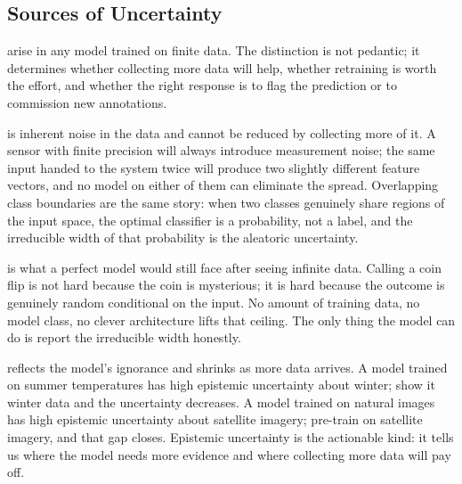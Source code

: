
\newpage

\subsection{Sources of Uncertainty}


 arise in any model trained on finite data.
The distinction is not pedantic; it determines whether collecting more data will help, whether retraining is worth the effort, and whether the right response is to flag the prediction or to commission new annotations.

 is inherent noise in the data and cannot be reduced by collecting more of it.
A sensor with finite precision will always introduce measurement noise; the same input handed to the system twice will produce two slightly different feature vectors, and no model on either of them can eliminate the spread.
Overlapping class boundaries are the same story: when two classes genuinely share regions of the input space, the optimal classifier is a probability, not a label, and the irreducible width of that probability is the aleatoric uncertainty.

 is what a perfect model would still face after seeing infinite data.
Calling a coin flip is not hard because the coin is mysterious; it is hard because the outcome is genuinely random conditional on the input.
No amount of training data, no model class, no clever architecture lifts that ceiling.
The only thing the model can do is report the irreducible width honestly.

 reflects the model's ignorance and shrinks as more data arrives.
A model trained on summer temperatures has high epistemic uncertainty about winter; show it winter data and the uncertainty decreases.
A model trained on natural images has high epistemic uncertainty about satellite imagery; pre-train on satellite imagery, and that gap closes.
Epistemic uncertainty is the actionable kind: it tells us where the model needs more evidence and where collecting more data will pay off.


